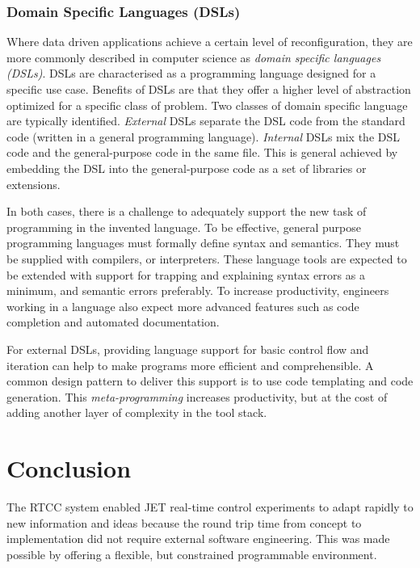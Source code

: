 \documentclass[5p]{elsarticle}
\begin{document}
\subsubsection{Domain Specific Languages (DSLs)}

Where data driven applications achieve a certain level of reconfiguration, they are more commonly
described in computer science as {\em domain specific languages (DSLs)}. DSLs are characterised
as a programming language designed for a specific use case.  Benefits of DSLs are that they 
offer a higher level of abstraction optimized for a specific class of problem. Two classes
of domain specific language are typically identified. {\em External} DSLs separate the DSL
code from the standard code (written in a general programming language).  {\em Internal} DSLs
mix the DSL code and the general-purpose code in the same file.  This is general achieved by
embedding the DSL into the general-purpose code as a set of libraries or extensions.

In both cases, there is a challenge to adequately support the new task of programming
in the invented language.  To be effective, general purpose programming languages must
formally define syntax and semantics. They must be supplied with compilers, or interpreters.
These language tools are expected to be extended with support for trapping and explaining
syntax errors as a minimum, and semantic errors preferably.  To increase productivity, 
engineers working in a language also expect more advanced features such as code completion
and automated documentation.

For external DSLs, providing language support for basic control flow and iteration
can help to make programs more efficient and comprehensible.  A common design pattern
to deliver this support is to use code templating and code generation.  This
{\em meta-programming} increases productivity, but at the cost of adding another
layer of complexity in the tool stack.



\section{Conclusion}

The RTCC system enabled JET real-time control experiments to adapt rapidly to new information
and ideas because the round trip time from concept to implementation did not require 
external software engineering. This was made possible by offering a flexible, but 
constrained programmable environment.
\end{document}
